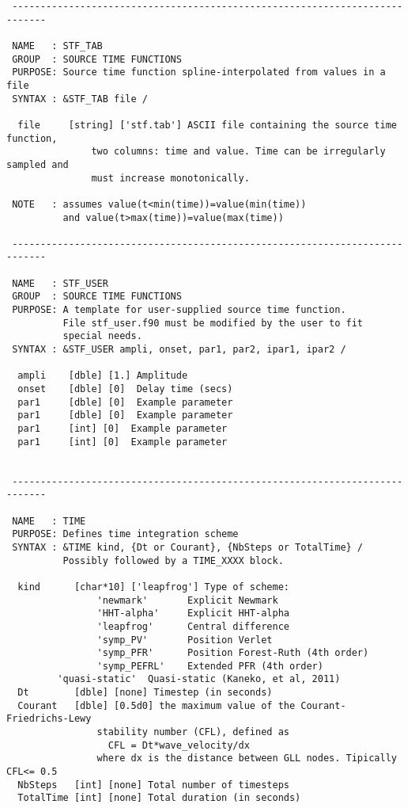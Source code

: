 \begin{verbatim}
 ----------------------------------------------------------------------------

 NAME   : STF_TAB
 GROUP  : SOURCE TIME FUNCTIONS
 PURPOSE: Source time function spline-interpolated from values in a file 
 SYNTAX : &STF_TAB file /

  file     [string] ['stf.tab'] ASCII file containing the source time function,
               two columns: time and value. Time can be irregularly sampled and
               must increase monotonically.

 NOTE   : assumes value(t<min(time))=value(min(time)) 
          and value(t>max(time))=value(max(time))

 ----------------------------------------------------------------------------

 NAME   : STF_USER
 GROUP  : SOURCE TIME FUNCTIONS
 PURPOSE: A template for user-supplied source time function.
          File stf_user.f90 must be modified by the user to fit
          special needs.
 SYNTAX : &STF_USER ampli, onset, par1, par2, ipar1, ipar2 /

  ampli    [dble] [1.] Amplitude
  onset    [dble] [0]  Delay time (secs)
  par1     [dble] [0]  Example parameter
  par1     [dble] [0]  Example parameter
  par1     [int] [0]  Example parameter
  par1     [int] [0]  Example parameter


 ----------------------------------------------------------------------------

 NAME   : TIME
 PURPOSE: Defines time integration scheme
 SYNTAX : &TIME kind, {Dt or Courant}, {NbSteps or TotalTime} /
          Possibly followed by a TIME_XXXX block.

  kind      [char*10] ['leapfrog'] Type of scheme:
                'newmark'       Explicit Newmark
                'HHT-alpha'     Explicit HHT-alpha
                'leapfrog'      Central difference
                'symp_PV'       Position Verlet
                'symp_PFR'      Position Forest-Ruth (4th order)
                'symp_PEFRL'    Extended PFR (4th order)
		 'quasi-static'  Quasi-static (Kaneko, et al, 2011)
  Dt        [dble] [none] Timestep (in seconds)
  Courant   [dble] [0.5d0] the maximum value of the Courant-Friedrichs-Lewy 
                stability number (CFL), defined as
                  CFL = Dt*wave_velocity/dx 
                where dx is the distance between GLL nodes. Tipically CFL<= 0.5
  NbSteps   [int] [none] Total number of timesteps
  TotalTime [int] [none] Total duration (in seconds)


\end{verbatim}
